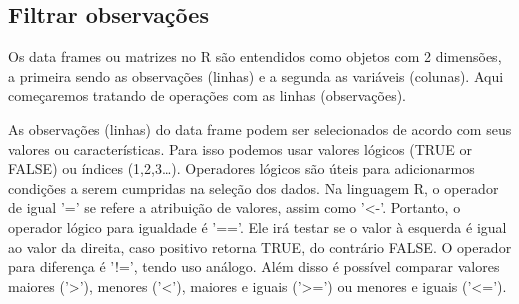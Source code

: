 \documentclass[
]{book}
\newenvironment{Shaded}{\begin{snugshade}}{\end{snugshade}}
\newcommand{\CommentTok}[1]{\textcolor[rgb]{0.56,0.35,0.01}{\textit{#1}}}
\newcommand{\DecValTok}[1]{\textcolor[rgb]{0.00,0.00,0.81}{#1}}
\newcommand{\FloatTok}[1]{\textcolor[rgb]{0.00,0.00,0.81}{#1}}
\newcommand{\FunctionTok}[1]{\textcolor[rgb]{0.00,0.00,0.00}{#1}}
\newcommand{\NormalTok}[1]{#1}
\newcommand{\OtherTok}[1]{\textcolor[rgb]{0.56,0.35,0.01}{#1}}
\newcommand{\SpecialCharTok}[1]{\textcolor[rgb]{0.00,0.00,0.00}{#1}}
\newcommand{\StringTok}[1]{\textcolor[rgb]{0.31,0.60,0.02}{#1}}
\begin{document}
\begin{Shaded}
\end{Shaded}

\hypertarget{filtrar-observauxe7uxf5es}{%
\subsection{Filtrar observações}\label{filtrar-observauxe7uxf5es}}

Os data frames ou matrizes no R são entendidos como objetos com 2 dimensões, a primeira sendo as observações (linhas) e a segunda as variáveis (colunas). Aqui começaremos tratando de operações com as linhas (observações).

As observações (linhas) do data frame podem ser selecionados de acordo com seus valores ou características. Para isso podemos usar valores lógicos (TRUE or FALSE) ou índices (1,2,3\ldots). Operadores lógicos são úteis para adicionarmos condições a serem cumpridas na seleção dos dados. Na linguagem R, o operador de igual '=' se refere a atribuição de valores, assim como '\textless-'. Portanto, o operador lógico para igualdade é '=='. Ele irá testar se o valor à esquerda é igual ao valor da direita, caso positivo retorna TRUE, do contrário FALSE. O operador para diferença é '!=', tendo uso análogo. Além disso é possível comparar valores maiores ('\textgreater'), menores ('\textless'), maiores e iguais ('\textgreater=') ou menores e iguais ('\textless=').
\end{document}
